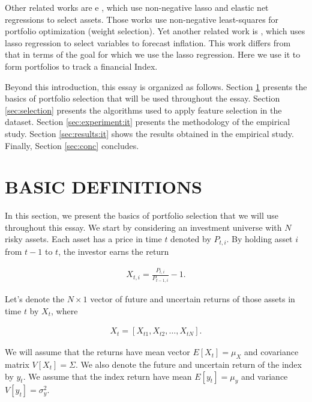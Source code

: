\documentclass[12pt,oneside,a4paper]{memoir}
\begin{document}
Other related works are  e , which use non-negative lasso and elastic net regressions to select assets.
Those works use non-negative least-squares for portfolio optimization (weight selection).
Yet another related work is , which uses lasso regression to select variables to forecast inflation.
This work differs from that in terms of the goal for which we use the lasso regression.
Here we use it to form portfolios to track a financial Index.

Beyond this introduction, this essay is organized as follows.
Section \ref{sec:defs} presents the basics of portfolio selection that will be used throughout the essay.
Section \ref{sec:selection} presents the algorithms used to apply feature selection in the dataset.
Section \ref{sec:experiment:it} presents the methodology of the empirical study.
Section \ref{sec:results:it} shows the results obtained in the empirical study.
Finally, Section \ref{sec:conc} concludes.

\section{BASIC DEFINITIONS} \label{sec:defs}

In this section, we present the basics of portfolio selection that we will use throughout this essay.
We start by considering an investment universe with $N$ risky assets.
Each asset has a price in time $t$ denoted by $P_{t,i}$.
By holding asset $i$ from $t-1$ to $t$, the investor earns the return

\vspace{-18 pt}
\begin{align} \label{eq:ret}
	X_{t,i} = \frac{P_{t,i}}{P_{t-1,i}} - 1.
\end{align}

Let's  denote the $N\times1$ vector of future and uncertain returns of those assets in time $t$ by $X_{t}$, where 

\vspace{-18 pt}
\begin{align*} %
	X_{t} =  [X_{t1}, X_{t2} , \dots, X_{tN}].
\end{align*}

\noindent
We will assume that the returns have mean vector $E[X_{t}] =\mu_{X}$ and covariance matrix $V[X_{t}] =\Sigma$.
We also denote the future and uncertain return of the index by $y_{t}$.
We assume that the index return have mean $E[y_{t}] = \mu_{y}$ and variance $V[y_{t}]=\sigma^2_{y}$.
\end{document}
